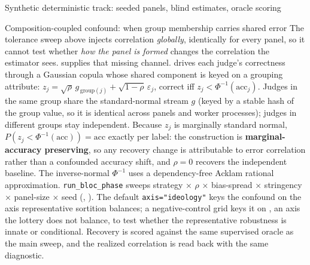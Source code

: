 \documentclass[
  ignorenonframetext,
]{beamer}
\begin{document}
\begin{frame}{Synthetic deterministic track:
seeded panels, blind estimates, oracle scoring}
\begin{block}{Composition-coupled confound: when group membership
carries shared error}
\protect{}\label{composition-coupled-confound-when-group-membership-carries-shared-error}
The tolerance sweep above injects correlation \emph{globally},
identically for every panel, so it cannot test whether \emph{how the
panel is formed} changes the correlation the estimator sees.
 supplies that missing channel.
drives each judge's correctness through a Gaussian copula whose shared
component is keyed on a grouping attribute:
\(z_j = \sqrt{\rho}\,g_{\,\mathrm{group}(j)}
+ \sqrt{1-\rho}\,\varepsilon_j\), correct iff
\(z_j < \Phi^{-1}(\mathrm{acc}_j)\). Judges in the same group share the
standard-normal stream \(g\) (keyed by a stable hash of the group value,
so it is identical across panels and worker processes); judges in
different groups stay independent. Because \(z_j\) is marginally
standard normal, \(P(z_j < \Phi^{-1}(\mathrm{acc})) = \mathrm{acc}\)
exactly per label: the construction is \textbf{marginal-accuracy
preserving}, so any recovery change is attributable to error correlation
rather than a confounded accuracy shift, and \(\rho=0\) recovers the
independent baseline. The inverse-normal \(\Phi^{-1}\) uses a
dependency-free Acklam rational approximation. \texttt{run\_bloc\_phase}
sweeps strategy × \(\rho\) × bias-spread × stringency × panel-size ×
seed (,
). The default
\texttt{axis="ideology"} keys the confound on the axis representative
sortition balances; a negative-control grid keys it on
, an axis the lottery does not balance,
to test whether the representative robustness is innate or conditional.
Recovery is scored against the same supervised oracle as the main sweep,
and the realized correlation is read back with the same
 diagnostic.
\end{block}


\end{frame}
\end{document}
